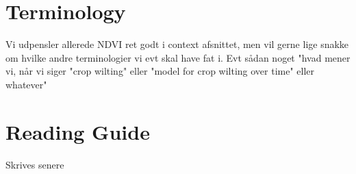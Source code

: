 \section{Terminology}
Vi udpensler allerede NDVI ret godt i context afsnittet, men vil gerne lige snakke om hvilke andre terminologier vi evt skal have fat i. Evt sådan noget "hvad mener vi, når vi siger "crop wilting" eller "model for crop wilting over time" eller whatever"

\section{Reading Guide}
Skrives senere